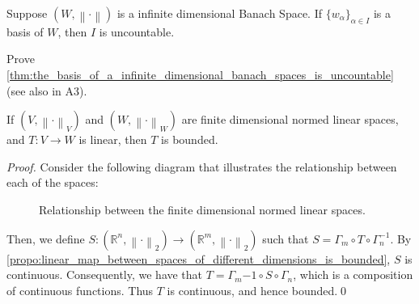 \documentclass[notoc,notitlepage]{tufte-book}
\newcommand{\norm}[1]{\left\| #1 \right\|}
\begin{document}
\begin{thm}\label{thm:the_basis_of_a_infinite_dimensional_banach_spaces_is_uncountable}
  Suppose $(W, \norm\cdot)$ is a infinite dimensional Banach Space. If $\{ w_\alpha \}_{\alpha \in I}$ is a basis of $W$, then $I$ is uncountable.
\end{thm}

\begin{ex}
  Prove \cref{thm:the_basis_of_a_infinite_dimensional_banach_spaces_is_uncountable} (see also in A3).
\end{ex}

\begin{thm}\label{thm:all_linear_maps_between_finite_dimensional_normed_linear_spaces_are_bounded}
  If $(V, \norm\cdot_V)$ and $(W, \norm\cdot_W)$ are finite dimensional normed linear spaces, and $T: V \to W$ is linear, then $T$ is bounded.
\end{thm}

\begin{proof}
  Consider the following diagram that illustrates the relationship between each of the spaces:
  \begin{figure}[ht]
    \centering
    \caption{Relationship between the finite dimensional normed linear spaces.}
    \label{fig:relationship_between_the_finite_dimensional_normed_linear_spaces}
  \end{figure}
  Then, we define $S : (\mathbb{R}^n, \norm\cdot_2) \to (\mathbb{R}^m, \norm\cdot_2)$ such that $S = \Gamma_m \circ T \circ \Gamma_n^{-1}$. By \cref{propo:linear_map_between_spaces_of_different_dimensions_is_bounded}, $S$ is continuous. Consequently, we have that $T = \Gamma_m{-1} \circ S \circ \Gamma_n$, which is a composition of continuous functions. Thus $T$ is continuous, and hence bounded.\qed\
\end{proof}
\end{document}
